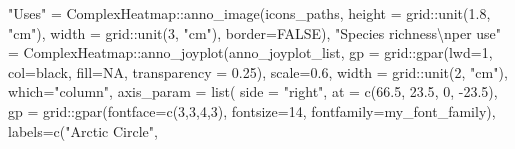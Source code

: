 \documentclass[
]{article}
\newenvironment{Shaded}{\begin{snugshade}}{\end{snugshade}}
\newcommand{\AttributeTok}[1]{\textcolor[rgb]{0.77,0.63,0.00}{#1}}
\newcommand{\ConstantTok}[1]{\textcolor[rgb]{0.00,0.00,0.00}{#1}}
\newcommand{\DecValTok}[1]{\textcolor[rgb]{0.00,0.00,0.81}{#1}}
\newcommand{\FloatTok}[1]{\textcolor[rgb]{0.00,0.00,0.81}{#1}}
\newcommand{\FunctionTok}[1]{\textcolor[rgb]{0.00,0.00,0.00}{#1}}
\newcommand{\NormalTok}[1]{#1}
\newcommand{\OtherTok}[1]{\textcolor[rgb]{0.56,0.35,0.01}{#1}}
\newcommand{\SpecialCharTok}[1]{\textcolor[rgb]{0.00,0.00,0.00}{#1}}
\newcommand{\StringTok}[1]{\textcolor[rgb]{0.31,0.60,0.02}{#1}}
\begin{document}
\begin{Shaded}
\begin{Highlighting}[]
  \StringTok{"Uses"} \OtherTok{=}\NormalTok{ ComplexHeatmap}\SpecialCharTok{::}\FunctionTok{anno\_image}\NormalTok{(icons\_paths,}
                                      \AttributeTok{height =}\NormalTok{ grid}\SpecialCharTok{::}\FunctionTok{unit}\NormalTok{(}\FloatTok{1.8}\NormalTok{, }\StringTok{"cm"}\NormalTok{),}
                                      \AttributeTok{width =}\NormalTok{ grid}\SpecialCharTok{::}\FunctionTok{unit}\NormalTok{(}\DecValTok{3}\NormalTok{, }\StringTok{"cm"}\NormalTok{),}
                                      \AttributeTok{border=}\ConstantTok{FALSE}\NormalTok{),}
  \StringTok{"Species richness}\SpecialCharTok{\textbackslash{}n}\StringTok{per use"} \OtherTok{=}\NormalTok{ ComplexHeatmap}\SpecialCharTok{::}\FunctionTok{anno\_joyplot}\NormalTok{(anno\_joyplot\_list,}
                            \AttributeTok{gp =}\NormalTok{ grid}\SpecialCharTok{::}\FunctionTok{gpar}\NormalTok{(}\AttributeTok{lwd=}\DecValTok{1}\NormalTok{, }\AttributeTok{col=}\StringTok{\textquotesingle{}black\textquotesingle{}}\NormalTok{,}
                                            \AttributeTok{fill=}\ConstantTok{NA}\NormalTok{,}
                                            \AttributeTok{transparency =} \FloatTok{0.25}\NormalTok{),}
                                  \AttributeTok{scale=}\FloatTok{0.6}\NormalTok{,}
                                \AttributeTok{width =}\NormalTok{ grid}\SpecialCharTok{::}\FunctionTok{unit}\NormalTok{(}\DecValTok{2}\NormalTok{, }\StringTok{"cm"}\NormalTok{),}
                                \AttributeTok{which=}\StringTok{"column"}\NormalTok{,}
                                \AttributeTok{axis\_param =} \FunctionTok{list}\NormalTok{(}
                                  \AttributeTok{side =} \StringTok{"right"}\NormalTok{,}
                                  \AttributeTok{at =} \FunctionTok{c}\NormalTok{(}\FloatTok{66.5}\NormalTok{, }\FloatTok{23.5}\NormalTok{, }\DecValTok{0}\NormalTok{, }\SpecialCharTok{{-}}\FloatTok{23.5}\NormalTok{),}
                                  \AttributeTok{gp =}\NormalTok{ grid}\SpecialCharTok{::}\FunctionTok{gpar}\NormalTok{(}\AttributeTok{fontface=}\FunctionTok{c}\NormalTok{(}\DecValTok{3}\NormalTok{,}\DecValTok{3}\NormalTok{,}\DecValTok{4}\NormalTok{,}\DecValTok{3}\NormalTok{),}
                                                  \AttributeTok{fontsize=}\DecValTok{14}\NormalTok{,}
                                                  \AttributeTok{fontfamily=}\NormalTok{my\_font\_family),}
                                  \AttributeTok{labels=}\FunctionTok{c}\NormalTok{(}\StringTok{"Arctic Circle"}\NormalTok{,}

\end{Highlighting}
\end{Shaded}
\end{document}
